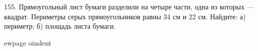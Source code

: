 155. Прямоугольный лист бумаги разделили на четыре части, одна из которых --- квадрат. Периметры серых прямоугольников равны 34 см и 22 см. Найдите: а) периметр; б) площадь листа бумаги.
\begin{center}
\begin{figure}[ht!]
\end{figure}
\end{center}
ewpage
oindent
